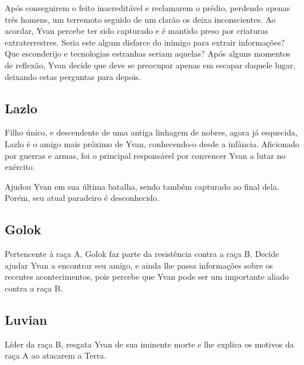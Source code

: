 \documentclass[12pt, a4paper]{article}
\begin{document}
        Após conseguirem o feito inacreditável e reclamarem o prédio, perdendo
        apenas três homens, um terremoto seguido de um clarão os deixa inconscientes.
        Ao acordar, Yvan percebe ter sido capturado e é mantido preso por 
        criaturas extraterrestres. Seria este algum disfarce do inimigo para
        extrair informações? Que esconderijo e tecnologias estranhas seriam
        aquelas? Após alguns momentos de reflexão, Yvan decide que deve se 
        preocupar apenas em escapar daquele lugar, deixando estas perguntas
        para depois.

    \subsection{Lazlo}
        Filho único, e descendente de uma antiga linhagem de nobres, agora já
        esquecida, Lazlo é o amigo mais próximo de Yvan, conhecendo-o desde a 
        infância. Aficionado por guerras e armas, foi o principal responsável
        por convencer Yvan a lutar no exército.

        Ajudou Yvan em sua última batalha, sendo também capturado ao final dela.
        Porém, seu atual paradeiro é desconhecido.

    \subsection{Golok}
        Pertencente à raça A, Golok faz parte da resistência contra a raça B. Decide
        ajudar Yvan a encontrar seu amigo, e ainda lhe passa informações sobre
        os recentes acontecimentos, pois percebe que Yvan pode ser um importante
        aliado contra a raça B.

    \subsection{Luvian}
        Líder da raça B, resgata Yvan de sua iminente morte e lhe explica
        os motivos da raça A ao atacarem a Terra.
\end{document}
